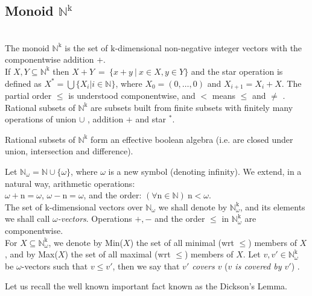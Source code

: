 \documentclass[a4paper]{llncs}
\begin{document}
\subsection{Monoid $\mathbb{N}^\mathrm{k}$}
\begin{definition}
\label{def_mon}\\
The monoid $\mathbb{N}^\mathrm{k}$ is the set of $\mathrm{k}$-dimensional non-negative integer vectors with the componentwise addition $+$.
\\
If $X,Y\subseteq \mathbb{N}^\mathrm{k}$ then $X+Y\ =\ \{x+y\ |\ x\in X, y\in Y\}$ and the star operation is defined as $X^*=\bigcup\{X_i | i\in \mathbb{N}\}$, where $X_0=(0,\ldots,0)$ and $X_{i+1}= X_i+X$. The partial order $\leq$ is understood componentwise, and $<$ means $\leq$  and $\neq$ . Rational subsets of $\mathbb{N}^\mathrm{k}$ are subsets built from finite subsets with finitely many operations of union $\cup$ , addition $+$ and star $^*$.
\end{definition}
\begin{theorem}
\label{twGins}
Rational subsets of $\mathbb{N}^\mathrm{k}$ form an effective boolean algebra (i.e. are closed under union, intersection and difference).

\end{theorem}
\begin{definition} 
\label{d25}
Let $\mathbb{N}_\omega=\mathbb{N}\cup \{\omega \}$, where $\omega$  is a new symbol (denoting infinity). We extend, in a natural way, arithmetic operations: \\$\omega+\mathrm{n}=\omega$, $\omega-\mathrm{n}=\omega$, and the order: $(\forall \mathrm{n}\in \mathbb{N}) \ \mathrm{n}<\omega$. \\The set of k-dimensional vectors over $\mathbb{N}_\omega$ we shall denote by $\mathbb{N}_\omega^\mathrm{k}$, and its elements we shall call \emph{$\omega$-vectors}. Operations $+,-$ and the order $\leq$ in $\mathbb{N}_\omega^\mathrm{k}$ are componentwise.
\\ 
For $X\subseteq \mathbb{N}_\omega^\mathrm{k}$, we denote by Min($X$) the set of all minimal (wrt $\leq$) members of $X$, and by Max($X$) the set of all maximal (wrt $\leq$) members of $X$. Let $v,v' \in  \mathbb{N}_\omega^\mathrm{k}$ be $\omega$-vectors such that $v \leq v'$, then we say that \emph{$v'$ covers $v$} (\emph{$v$ is covered by $v'$}) .
\end{definition}
Let us recall the well known important fact known as the Dickson's Lemma.
\end{document}
